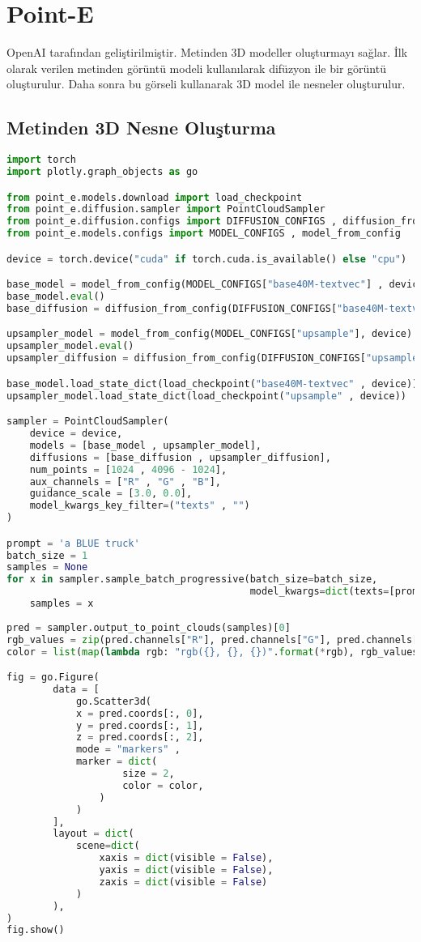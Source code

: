 \section{Point-E}
OpenAI tarafından geliştirilmiştir. Metinden 3D modeller oluşturmayı sağlar. İlk olarak verilen metinden görüntü modeli kullanılarak difüzyon ile bir görüntü oluşturulur. Daha sonra bu görseli kullanarak 3D model ile nesneler oluşturulur. 

\subsection{Metinden 3D Nesne Oluşturma}
\begin{lstlisting}[language=Python]
import torch
import plotly.graph_objects as go

from point_e.models.download import load_checkpoint
from point_e.diffusion.sampler import PointCloudSampler
from point_e.diffusion.configs import DIFFUSION_CONFIGS , diffusion_from_config
from point_e.models.configs import MODEL_CONFIGS , model_from_config

device = torch.device("cuda" if torch.cuda.is_available() else "cpu")

base_model = model_from_config(MODEL_CONFIGS["base40M-textvec"] , device)
base_model.eval()
base_diffusion = diffusion_from_config(DIFFUSION_CONFIGS["base40M-textvec"])

upsampler_model = model_from_config(MODEL_CONFIGS["upsample"], device)
upsampler_model.eval()
upsampler_diffusion = diffusion_from_config(DIFFUSION_CONFIGS["upsample"])

base_model.load_state_dict(load_checkpoint("base40M-textvec" , device))
upsampler_model.load_state_dict(load_checkpoint("upsample" , device))

sampler = PointCloudSampler(
    device = device,
    models = [base_model , upsampler_model],
    diffusions = [base_diffusion , upsampler_diffusion],
    num_points = [1024 , 4096 - 1024],
    aux_channels = ["R" , "G" , "B"],
    guidance_scale = [3.0, 0.0],
    model_kwargs_key_filter=("texts" , "")
)

prompt = 'a BLUE truck'
batch_size = 1
samples = None
for x in sampler.sample_batch_progressive(batch_size=batch_size, 
                                          model_kwargs=dict(texts=[prompt])):
    samples = x
    
pred = sampler.output_to_point_clouds(samples)[0]
rgb_values = zip(pred.channels["R"], pred.channels["G"], pred.channels["B"])
color = list(map(lambda rgb: "rgb({}, {}, {})".format(*rgb), rgb_values))

fig = go.Figure(
        data = [
            go.Scatter3d(
            x = pred.coords[:, 0], 
            y = pred.coords[:, 1], 
            z = pred.coords[:, 2],
            mode = "markers" ,
            marker = dict(
                    size = 2,
                    color = color,
                )
            )
        ],
        layout = dict(
            scene=dict(
                xaxis = dict(visible = False),
                yaxis = dict(visible = False),
                zaxis = dict(visible = False)
            )
        ),
)
fig.show()
\end{lstlisting}



\newpage